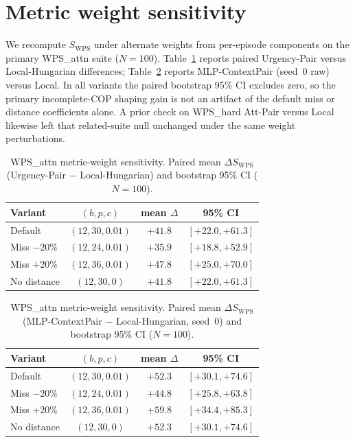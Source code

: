 \documentclass[journal,twocolumn,10pt]{IEEEtran}
\begin{document}
\section{Metric weight sensitivity}
\label{app:sens}
We recompute \(S_{\mathrm{WPS}}\) under alternate weights from per-episode components on the primary WPS\_attn suite (\(N{=}100\)).
Table~\ref{tab:sens} reports paired Urgency-Pair versus Local-Hungarian differences; Table~\ref{tab:sensmlp} reports MLP-ContextPair (seed~0 raw) versus Local.
In all variants the paired bootstrap 95\% CI excludes zero, so the primary incomplete-COP shaping gain is not an artifact of the default miss or distance coefficients alone.
A prior check on WPS\_hard Att-Pair versus Local likewise left that related-suite null unchanged under the same weight perturbations.

\begin{table}[t]
\centering
\caption{WPS\_attn metric-weight sensitivity. Paired mean \(\Delta S_{\mathrm{WPS}}\) (Urgency-Pair $-$ Local-Hungarian) and bootstrap 95\% CI (\(N{=}100\)).}
\label{tab:sens}
\setlength{\tabcolsep}{3pt}
\begin{tabular}{lccc}
\toprule
Variant & \((b,p,c)\) & mean \(\Delta\) & 95\% CI \\
\midrule
Default & \((12,30,0.01)\) & $+41.8$ & $[+22.0,+61.3]$ \\
Miss $-20\%$ & \((12,24,0.01)\) & $+35.9$ & $[+18.8,+52.9]$ \\
Miss $+20\%$ & \((12,36,0.01)\) & $+47.8$ & $[+25.0,+70.0]$ \\
No distance & \((12,30,0)\) & $+41.8$ & $[+22.0,+61.3]$ \\
\bottomrule
\end{tabular}
\end{table}

\begin{table}[t]
\centering
\caption{WPS\_attn metric-weight sensitivity. Paired mean \(\Delta S_{\mathrm{WPS}}\) (MLP-ContextPair $-$ Local-Hungarian, seed~0) and bootstrap 95\% CI (\(N{=}100\)).}
\label{tab:sensmlp}
\setlength{\tabcolsep}{3pt}
\begin{tabular}{lccc}
\toprule
Variant & \((b,p,c)\) & mean \(\Delta\) & 95\% CI \\
\midrule
Default & \((12,30,0.01)\) & $+52.3$ & $[+30.1,+74.6]$ \\
Miss $-20\%$ & \((12,24,0.01)\) & $+44.8$ & $[+25.8,+63.8]$ \\
Miss $+20\%$ & \((12,36,0.01)\) & $+59.8$ & $[+34.4,+85.3]$ \\
No distance & \((12,30,0)\) & $+52.3$ & $[+30.1,+74.6]$ \\
\bottomrule
\end{tabular}
\end{table}



\end{document}
